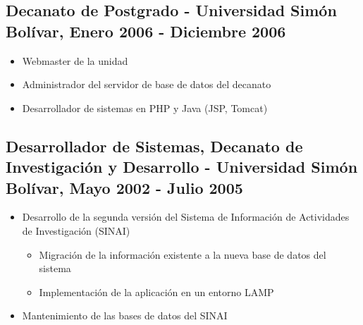 \documentclass[letterpaper,11pt]{report}
\begin{document}
\subsection*{Decanato de Postgrado - Universidad Simón Bolívar, Enero 2006 - Diciembre 2006}
\begin{itemize}
\item Webmaster de la unidad
\item Administrador del servidor de base de datos del decanato
\item Desarrollador de sistemas en PHP y Java (JSP, Tomcat)
\end{itemize}

\subsection*{Desarrollador de Sistemas, Decanato de Investigación y Desarrollo - Universidad Simón Bolívar, Mayo 2002 - Julio 2005}
\begin{itemize}
\item Desarrollo de la segunda versión del Sistema de Información de Actividades de Investigación (SINAI)
\begin{itemize}
	\item Migración de la información existente a la nueva base de datos del sistema
	\item Implementación de la aplicación en un entorno LAMP
\end{itemize}
\item Mantenimiento de las bases de datos del SINAI
\end{itemize}
\end{document}
